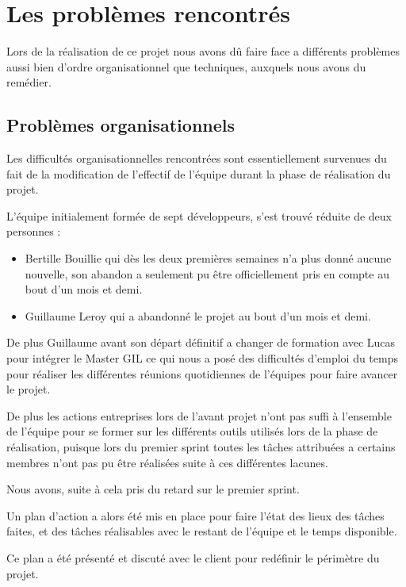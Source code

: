\documentclass{../res/univ-projet}
\begin{document}
\section{Les problèmes rencontrés}

  Lors de la réalisation de ce projet nous avons dû faire face a
  différents problèmes aussi bien d'ordre organisationnel que techniques,
  auxquels nous avons du remédier.

  \subsection{Problèmes organisationnels}

    Les difficultés organisationnelles rencontrées sont essentiellement
    survenues du fait de la modification de l'effectif de l'équipe durant la
    phase de réalisation du projet. 

    L'équipe initialement formée de sept développeurs,
    s'est trouvé réduite de deux personnes :
    \begin{itemize}
      \item Bertille Bouillie qui dès les deux premières semaines n'a plus donné
      aucune nouvelle, son abandon a seulement pu être officiellement pris en compte au bout d'un mois et demi.
      \item Guillaume Leroy qui a abandonné le projet au bout d'un mois et demi.
    \end{itemize}

    De plus Guillaume avant son départ définitif a changer de formation avec Lucas pour intégrer le Master GIL
    ce qui nous a posé des difficultés d'emploi du temps pour réaliser les différentes réunions quotidiennes
    de l'équipes pour faire avancer le projet.

    De plus les actions entreprises lors de l'avant projet n'ont pas suffi à l'ensemble de l'équipe 
    pour se former sur les différents outils utilisés lors de la phase de réalisation,
    puisque lors du premier sprint toutes les tâches attribuées a certains membres n'ont pas pu être
    réalisées suite à ces différentes lacunes.

    Nous avons, suite à cela pris du retard sur le premier sprint.

    Un plan d'action a alors été mis en place pour faire l'état des lieux des tâches
    faites, et des tâches réalisables avec le restant de l'équipe et le temps disponible.

    Ce plan a été présenté et discuté avec le client pour redéfinir le périmètre du projet.
\end{document}
